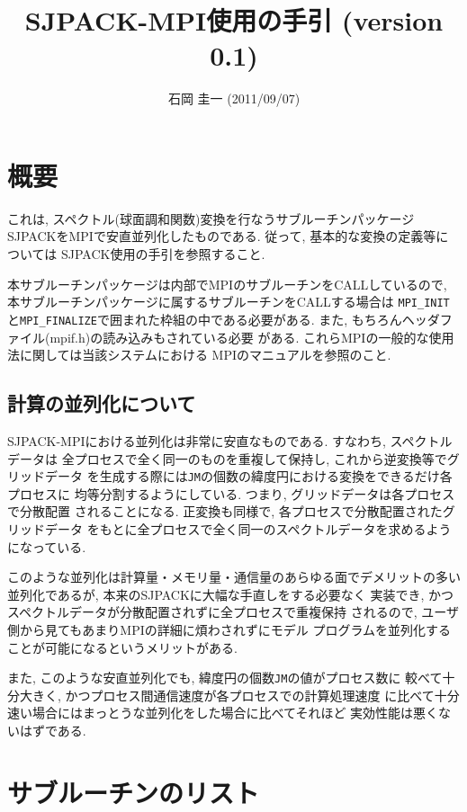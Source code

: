 \documentclass[a4j,fleqn]{jarticle}
\title{SJPACK-MPI使用の手引 (version 0.1)}
\author{石岡 圭一  (2011/09/07)}
\date{}
\begin{document}
\maketitle

\section{概要}

これは, スペクトル(球面調和関数)変換を行なうサブルーチンパッケージ
SJPACKをMPIで安直並列化したものである.
従って, 基本的な変換の定義等については
SJPACK使用の手引を参照すること.

本サブルーチンパッケージは内部でMPIのサブルーチンをCALLしているので,
本サブルーチンパッケージに属するサブルーチンをCALLする場合は
{\tt MPI\_INIT}と{\tt MPI\_FINALIZE}で囲まれた枠組の中である必要がある.
また, もちろんヘッダファイル(mpif.h)の読み込みもされている必要
がある. これらMPIの一般的な使用法に関しては当該システムにおける
MPIのマニュアルを参照のこと.

\subsection{計算の並列化について}

SJPACK-MPIにおける並列化は非常に安直なものである. すなわち, スペクトルデータは
全プロセスで全く同一のものを重複して保持し, これから逆変換等でグリッドデータ
を生成する際には{\tt JM}の個数の緯度円における変換をできるだけ各プロセスに
均等分割するようにしている. つまり, グリッドデータは各プロセスで分散配置
されることになる. 正変換も同様で, 各プロセスで分散配置されたグリッドデータ
をもとに全プロセスで全く同一のスペクトルデータを求めるようになっている.

このような並列化は計算量・メモリ量・通信量のあらゆる面でデメリットの多い
並列化であるが, 本来のSJPACKに大幅な手直しをする必要なく
実装でき, かつスペクトルデータが分散配置されずに全プロセスで重複保持
されるので, ユーザ側から見てもあまりMPIの詳細に煩わされずにモデル
プログラムを並列化することが可能になるというメリットがある.

また, このような安直並列化でも, 緯度円の個数{\tt JM}の値がプロセス数に
較べて十分大きく, かつプロセス間通信速度が各プロセスでの計算処理速度
に比べて十分速い場合にはまっとうな並列化をした場合に比べてそれほど
実効性能は悪くないはずである.



\section{サブルーチンのリスト}
\end{document}
